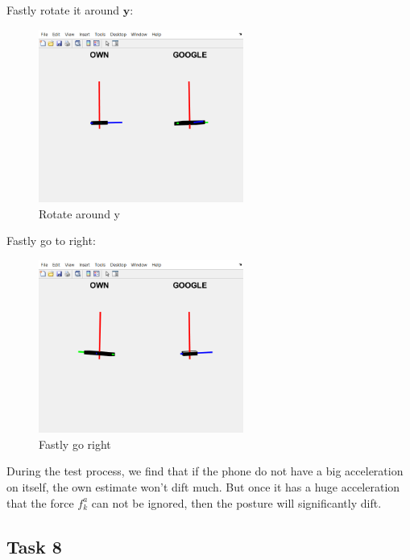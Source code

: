 Fastly rotate it around $ \mathbf{y} $:

\begin{figure}[H]
 \centering
 \includegraphics[width=0.6\textwidth]{images/rotatey.png}
 \caption{Rotate around y}
 \label{rotatey}
\end{figure}

Fastly go to right:

\begin{figure}[H]
 \centering
 \includegraphics[width=0.6\textwidth]{images/goright.png}
 \caption{Fastly go right}
 \label{fastright}
\end{figure}

During the test process, we find that if the phone do not have a big acceleration on itself, the own estimate won't dift much. But once it has a huge acceleration that the force $ f_k^a $ can not be ignored, then the posture will significantly dift.


\subsection{Task 8}

